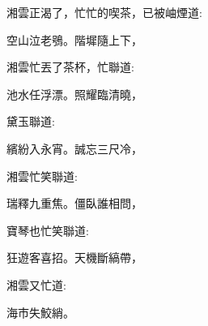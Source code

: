 \begin{parag}
    湘雲正渴了，忙忙的喫茶，已被岫煙道:
\end{parag}


\begin{poem}
    \begin{pl} 空山泣老鴞。階墀隨上下，\end{pl}
\end{poem}


\begin{parag}
    湘雲忙丟了茶杯，忙聯道:
\end{parag}


\begin{poem}
    \begin{pl} 池水任浮漂。照耀臨清曉，\end{pl}
\end{poem}


\begin{parag}
    黛玉聯道:
\end{parag}


\begin{poem}
    \begin{pl} 繽紛入永宵。誠忘三尺冷，\end{pl}
\end{poem}


\begin{parag}
    湘雲忙笑聯道:
\end{parag}


\begin{poem}
    \begin{pl} 瑞釋九重焦。僵臥誰相問，\end{pl}
\end{poem}


\begin{parag}
    寶琴也忙笑聯道:
\end{parag}


\begin{poem}
    \begin{pl} 狂遊客喜招。天機斷縞帶，\end{pl}
\end{poem}


\begin{parag}
    湘雲又忙道:
\end{parag}


\begin{poem}
    \begin{pl} 海市失鮫綃。\end{pl}
\end{poem}


